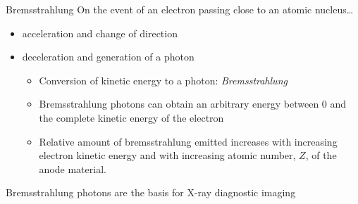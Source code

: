 \begin{frame}[c]{Bremsstrahlung}
    On the event of an electron passing close to an atomic nucleus\ldots

    \vspace{0.4cm}
    \begin{itemize}
        \setlength\itemsep{0.4cm}
        \item {} acceleration and change of direction
        \item {} deceleration and generation of a photon
              \vspace{0.2cm}

              \begin{itemize}
                  \setlength\itemsep{0.2cm}
                  \item Conversion of kinetic energy to a photon:  \textit{Bremsstrahlung}
                  \item Bremsstrahlung photons can obtain an arbitrary energy between 0 and the complete kinetic energy of the electron
                  \item Relative amount of bremsstrahlung emitted increases with increasing electron kinetic energy and with increasing atomic number, $Z$, of the anode material.
              \end{itemize}
    \end{itemize}
    \vspace{0.4cm}

    Bremsstrahlung photons are the basis for X-ray diagnostic imaging

\end{frame}

